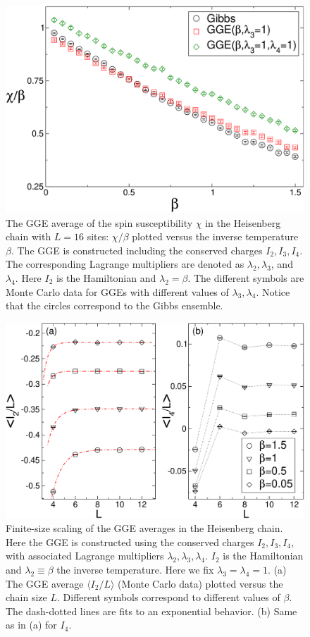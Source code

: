 \documentclass[twocolumn,superscriptaddress,prb,10pt]{revtex4-1}
\begin{document}
\begin{figure}[t]
\includegraphics*[width=0.93\linewidth]{./draft_figs/fig2}
\caption{The GGE average of the spin susceptibility $\chi$ in the Heisenberg chain 
 with $L=16$ sites: $\chi/\beta$ plotted versus the inverse temperature $\beta$. 
 The GGE is constructed including the conserved charges $I_2, I_3,I_4$. 
 The corresponding Lagrange multipliers are denoted as $\lambda_2,\lambda_3$, and 
 $\lambda_4$. Here $I_2$ is the Hamiltonian and $\lambda_2=\beta$. 
 The different symbols are Monte Carlo data for GGEs with different values of 
 $\lambda_3,\lambda_4$. Notice that the circles correspond to the Gibbs ensemble. 
}
\label{fig2}
\end{figure}

\begin{figure}[t]
\includegraphics*[width=0.93\linewidth]{./draft_figs/finite_size}
\caption{ Finite-size scaling of the GGE averages in the Heisenberg 
 chain. Here the GGE is constructed using the conserved charges $I_2,
 I_3, I_4$, with associated Lagrange multipliers $\lambda_2,\lambda_3,
 \lambda_4$. $I_2$ is the Hamiltonian and $\lambda_2\equiv\beta$ the 
 inverse temperature. Here we fix $\lambda_3=\lambda_4=1$. (a) The 
 GGE average $\langle I_2/L\rangle$ (Monte Carlo data) plotted versus 
 the chain size $L$. Different symbols correspond to different 
 values of $\beta$. The dash-dotted lines are fits to an exponential 
 behavior. (b) Same as in (a) for $I_4$.
}
\label{finite-size}
\end{figure}


\begin{thebibliography}{99}


\end{thebibliography}
\end{document}
